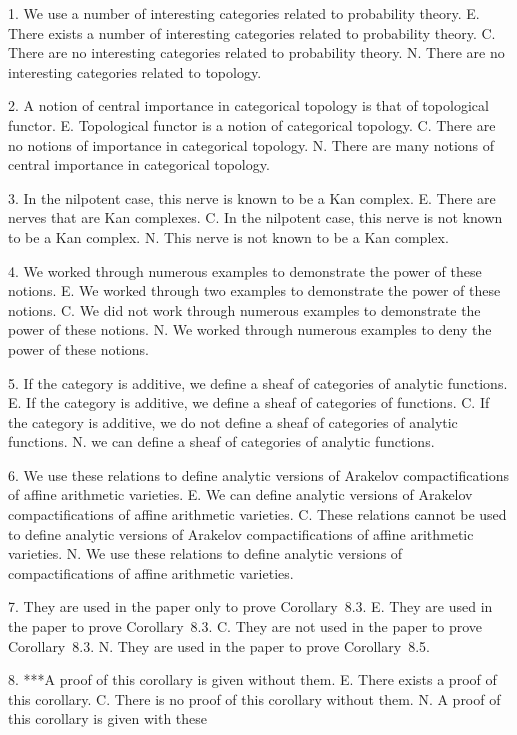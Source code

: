 
1. We use a number of interesting categories related to probability theory.
E. There exists a number of interesting categories related to probability theory.
C. There are no interesting categories related to probability theory.
N. There are no interesting categories related to topology.

2. A notion of central importance in categorical topology is that of topological functor.
E. Topological functor is a notion of categorical topology.
C. There are no notions of importance in categorical topology.
N. There are many  notions of central importance in categorical topology.

3. In the nilpotent case, this nerve is known to be a Kan complex.
E. There are nerves that are Kan complexes.
C. In the nilpotent case, this nerve is not known to be a Kan complex.
N. This nerve is not known to be a Kan complex.

4. We worked through numerous examples to demonstrate the power of these notions.
E. We worked through two examples to demonstrate the power of these notions.
C. We did not work through numerous examples to demonstrate the power of these notions.
N. We worked through numerous examples to deny the power of these notions.

5. If the category is additive, we define a sheaf of categories of analytic functions.
E. If the category is additive, we define a sheaf of categories of functions.
C. If the category is additive, we do not define a sheaf of categories of analytic functions.
N. we can define a sheaf of categories of analytic functions.

6. We use these relations to define analytic versions of Arakelov compactifications of affine arithmetic varieties.
E. We can define analytic versions of Arakelov compactifications of affine arithmetic varieties.
C. These relations cannot be used to define analytic versions of Arakelov compactifications of affine arithmetic varieties.
N. We use these relations to define analytic versions of  compactifications of affine arithmetic varieties.

7. They are used in the paper only to prove Corollary~8.3.
E. They are used in the paper  to prove Corollary~8.3.
C. They are not used in the paper  to prove Corollary~8.3.
N. They are used in the paper  to prove Corollary~8.5.

8. ***A proof of this corollary is given without them.
E. There exists a proof of this corollary.
C. There is no proof of this corollary without them.
N. A proof of this corollary is given with these

